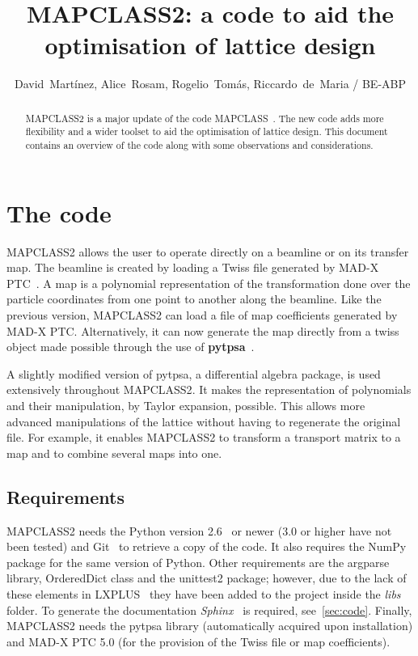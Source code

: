 \documentclass[a4paper]{cernatsnote}
\title{MAPCLASS2: a code to aid the optimisation of lattice design}
\author{David~Mart\'inez, Alice~Rosam, Rogelio~Tom\'as,
  Riccardo~de~Maria / BE-ABP}
\begin{document}
\maketitle %

\begin{abstract}
\textsc{MAPCLASS2} is a major update of the code
\textsc{MAPCLASS}~\cite{mapclass}. The new code adds more flexibility
and a wider toolset to aid the optimisation of lattice design. This
document contains an overview of the code along with some observations
and considerations.
\end{abstract}

\section{The code}
\label{sec:intro}
\textsc{MAPCLASS2} allows the user to operate directly on a beamline
or on its transfer map. The beamline is created by loading a Twiss
file generated by \textsc{MAD-X PTC}~\cite{madx}. A map is a polynomial
representation of the transformation done over the particle
coordinates from one point to another along the beamline. Like the
previous version, MAPCLASS2 can load a file of map coefficients
generated by \textsc{MAD-X PTC}. Alternatively, it can now generate the
map directly from a twiss object made possible through the use of
\textbf{pytpsa}~\cite{pytpsa}.

A slightly modified version of pytpsa, a differential algebra package,
is used extensively throughout \textsc{MAPCLASS2}. It makes the
representation of polynomials and their manipulation, by Taylor
expansion, possible. This allows more advanced manipulations of the lattice
without having to regenerate the original file. For example, it enables
\textsc{MAPCLASS2} to transform a transport matrix to a map and to combine
several maps into one.

\subsection{Requirements}
\label{sec:req}
\textsc{MAPCLASS2} needs the Python version 2.6~\cite{python} or newer
(3.0 or higher have not been tested) and Git~\cite{git} to retrieve a
copy of the code. It also requires the NumPy~\cite{numpy} package for
the same version of Python. Other requirements are the argparse
library, OrderedDict class and the unittest2 package; however, due to
the lack of these elements in LXPLUS~\cite{lxplus} they have been
added to the project inside the \textit{libs} folder. To generate the
documentation \textit{Sphinx}~\cite{sphinx} is required, see~\ref{sec:code}. 
Finally, \textsc{MAPCLASS2} needs the
pytpsa library (automatically acquired upon installation) and
\textsc{MAD-X PTC 5.0} (for the provision of the Twiss file or map
coefficients).
\end{document}
